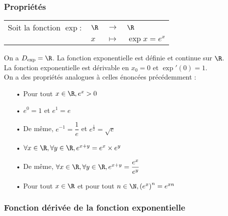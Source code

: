 \vspace*{-.3cm}

\subsubsection{Propriétés}

\begin{tabular}{llll}
\hspace*{-.3cm} Soit la fonction $\exp:$ & $\R$ & $\longrightarrow$ & $\R$ \\
& $x$ & $\longmapsto$ & $\exp x = e^x$ \\
\end{tabular}

\vspace*{.3cm}

On a $D_{\exp} = \R$. La fonction exponentielle est définie et continue sur $\R$. \\

La fonction exponentielle est dérivable en $x_0 = 0$ et $\exp'\left(0\right) = 1$. \\

On a des propriétés analogues à celles énoncées précédemment : \\

\begin{itemize}
\item[•] Pour tout $ x \in \R, e^x > 0$ 
\item[•] $e^0 = 1$ et $e^1 = e$ 
\item[•] De même, $e^{-1} = \dfrac{1}{e}$ et $e^{\frac{1}{2}} = \sqrt{e}$ \vspace*{.2cm}
\item[•] $\forall x \in \R, \forall y \in \R, e^{x + y} = e^x \times e^y$ 
\item[•] De même, $\forall x \in \R, \forall y \in \R, e^{x + y} = \dfrac{e^x}{e^y}$ 
\item[•] Pour tout $x \in \R$ et pour tout $n \in \N, \left(e^x\right)^n = e^{xn}$
\end{itemize}

\vspace*{-10cm}

\newpage

\vspace*{-2cm}

\subsubsection{Fonction dérivée de la fonction exponentielle}

